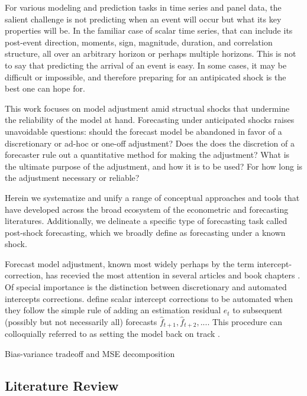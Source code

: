 \documentclass[11pt]{article}
\theoremstyle{definition}
\begin{document}
For various modeling and prediction tasks in time series and panel data, the salient challenge is not predicting when an event will occur but what its key properties will be.  In the familiar case of scalar time series, that can include its post-event direction, moments, sign, magnitude, duration, and correlation structure, all over an arbitrary horizon or perhaps multiple horizons. This is not to say that predicting the arrival of an event is easy. In some cases, it may be difficult or impossible, and therefore preparing for an antipicated shock is the best one can hope for.

This work focuses on model adjustment amid structual shocks that undermine the reliability of the  model at hand.  Forecasting under anticipated shocks raises unavoidable questions: should the forecast model be abandoned in favor of a discretionary or ad-hoc or one-off adjustment?  Does the does the discretion of a forecaster rule out a quantitative method for making the adjustment?  What is the ultimate purpose of the adjustment, and how it is to be used?  For how long is the adjustment necessary or reliable?

Herein we systematize and unify a range of conceptual approaches and tools that have developed across the broad ecosystem of the econometric and forecasting literatures.  Additionally, we delineate a specific type of forecasting task called post-shock forecasting, which we broadly define as forecasting under a known shock.

Forecast model adjustment, known most widely perhaps by the term intercept-correction, has recevied the most attention in several articles and book chapters \citep{hendry1994theory,clements1996intercept,clements1998forecasting}.  Of special importance is the distinction between discretionary and automated intercepts corrections. \cite{hendry1994theory} define scalar intercept corrections to be automated when they follow the simple rule of adding an estimation residual $e_{t}$ to subsequent (possibly but not necessarily all) forecasts $\hat f_{t+1},\hat f_{t+2},...$.  This procedure can colloquially referred to as setting the model back on track \citep{hendry1994theory}.



Bias-variance tradeoff and MSE decomposition\\

\subsection{Literature Review}
\end{document}
